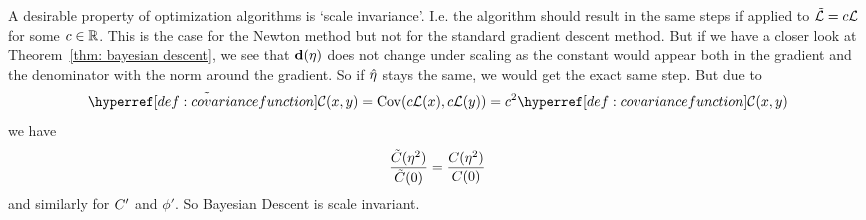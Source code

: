 A desirable property of optimization algorithms is `scale invariance'. I.e.
the algorithm should result in the same steps if applied to
\(\tilde{\mathcal{L}}=c\mathcal{L}\) for some \(c\in\mathbb{R}\). This is the case for the
Newton method but not for the standard gradient descent method. But if we have
a closer look at Theorem~\ref{thm: bayesian descent}, we see that
\(\mathbf{d}(\eta)\) does not change under scaling as the constant would appear both
in the gradient and the denominator with the norm around the gradient. So
if \(\hat{\eta}\) stays the same, we would get the exact same step. But
due to
\begin{equation*}
	\tilde{\C}(x,y) = \Cov(c\Loss(x), c\Loss(y)) = c^2 \C(x,y)
\end{equation*}
we have
\begin{equation*}
	\frac{\tilde{C}(\eta^2)}{\tilde{C}(0)}=\frac{C(\eta^2)}{C(0)}
\end{equation*}
and similarly for \(C'\) and \(\phi'\). So Bayesian Descent is scale
invariant.

